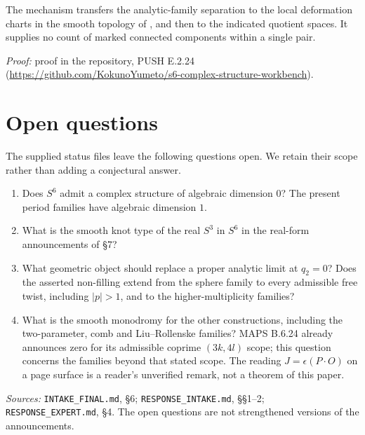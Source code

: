 \documentclass[11pt,a4paper]{article}
\theoremstyle{plain}
\theoremstyle{definition}
\begin{document}
The mechanism transfers the analytic-family separation to the local deformation charts in the smooth topology of \cite[\S2.1 and \S3.2, Theorem~3.4 and Remark~3.6]{Meersseman2019E}, and then to the indicated quotient spaces. It supplies no count of marked connected components within a single pair.

\noindent\emph{Proof:} proof in the repository, PUSH E.2.24 (\url{https://github.com/KokunoYumeto/s6-complex-structure-workbench}).


\section{Open questions}\label{sec:open}
The supplied status files leave the following questions open. We retain their scope rather than adding a conjectural answer.
\begin{enumerate}[leftmargin=*]
\item Does $S^6$ admit a complex structure of algebraic dimension $0$? The present period families have algebraic dimension $1$.
\item What is the smooth knot type of the real $S^3$ in $S^6$ in the real-form announcements of \S7?
\item What geometric object should replace a proper analytic limit at $q_2=0$? Does the asserted non-filling extend from the sphere family to every admissible free twist, including $|p|>1$, and to the higher-multiplicity families?
\item What is the smooth monodromy for the other constructions, including the two-parameter, comb and Liu--Rollenske families? MAPS B.6.24 already announces zero for its admissible coprime $(3k,4l)$ scope; this question concerns the families beyond that stated scope. The reading $J=\epsilon(P\cdot O)$ on a page surface is a reader's unverified remark, not a theorem of this paper.
\end{enumerate}
\noindent\textit{Sources:} \texttt{INTAKE\_FINAL.md}, \S6; \texttt{RESPONSE\_INTAKE.md}, \S\S1--2; \texttt{RESPONSE\_EXPERT.md}, \S4. The open questions are not strengthened versions of the announcements.
\end{document}
